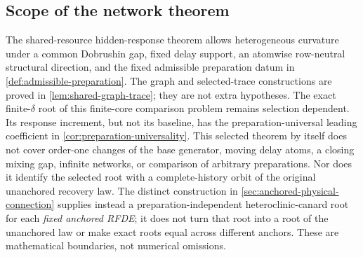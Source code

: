 \subsection{Scope of the network theorem}

The shared-resource hidden-response theorem allows heterogeneous
curvature under a common Dobrushin gap, fixed delay support, an atomwise
row-neutral structural direction, and the fixed admissible preparation datum
in \cref{def:admissible-preparation}.  The graph and selected-trace
constructions are proved in \cref{lem:shared-graph-trace}; they are not extra
hypotheses.  The exact finite-\(\delta\) root of this finite-core comparison
problem remains selection dependent.  Its response increment, but not its
baseline, has the preparation-universal leading coefficient in
\cref{cor:preparation-universality}.  This selected theorem by itself does not
cover order-one changes of the base generator, moving delay atoms, a closing
mixing gap, infinite networks, or comparison of arbitrary preparations.
Nor does it identify the selected root with a complete-history orbit of the
original unanchored recovery law.  The distinct construction in
\cref{sec:anchored-physical-connection} supplies instead a
preparation-independent heteroclinic-canard root for each \emph{fixed anchored
RFDE}; it does not turn that root into a root of the unanchored law or make
exact roots equal across different anchors.  These are mathematical
boundaries, not numerical omissions.
